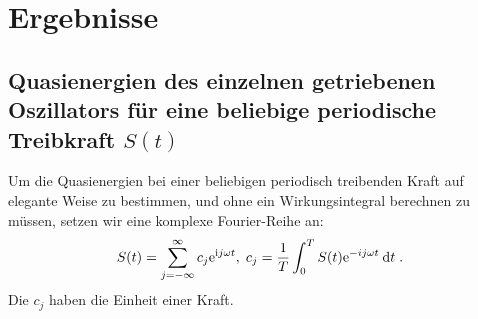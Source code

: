 \chapter{Ergebnisse}


\section{Quasienergien des einzelnen getriebenen Oszillators für eine beliebige periodische Treibkraft $S(t)$}
  Um die Quasienergien bei einer beliebigen periodisch treibenden Kraft auf elegante Weise zu bestimmen, und ohne ein Wirkungsintegral berechnen zu müssen, setzen wir eine komplexe Fourier-Reihe an:
  \begin{equation}
    S(t) = \sum_{j=-\infty}^\infty c_j \text e^{\text ij\omega t}, \; c_j = \frac{1}{T} \int_0^T S(t) \text e^{-ij\omega t} \: \text d t \; .
  \end{equation}
  Die $c_j$ haben die Einheit einer Kraft.

